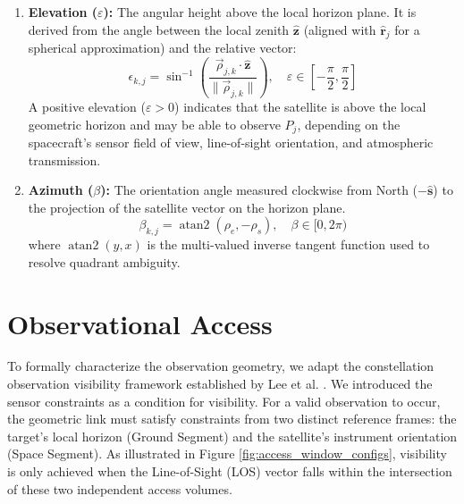 \begin{enumerate}
    \item \textbf{Elevation ($\varepsilon$):} The angular height above the local horizon plane. It is derived from the angle between the local zenith $\hat{\mathbf{z}}$ (aligned with $\hat{\boldsymbol{r}}_{j}$ for a spherical approximation) and the relative vector:    \begin{equation}
        \epsilon_{k,j} = \sin^{-1}\left( \frac{\vec{\rho}_{j,k} \cdot \hat{\mathbf{z}}}{\| \vec{\rho}_{j,k} \|} \right), \quad \varepsilon \in \left[ -\frac{\pi}{2}, \frac{\pi}{2} \right]
    \end{equation}
    A positive elevation ($\varepsilon > 0$) indicates that the satellite is above the local geometric horizon and may be able to observe $P_j$, depending on the spacecraft's sensor field of view, line-of-sight orientation, and atmospheric transmission. 
    \item \textbf{Azimuth ($\beta$):} The orientation angle measured clockwise from North ($-\hat{\mathbf{s}}$) to the projection of the satellite vector on the horizon plane.
\begin{equation}
        \beta_{k,j} = \operatorname{atan2}(\rho_e, -\rho_s), \quad \beta \in [0, 2\pi)
    \end{equation}
    where $\operatorname{atan2}(y, x)$ is the multi-valued inverse tangent function used to resolve quadrant ambiguity.
\end{enumerate}

\section{Observational Access}
\label{sec:observational_access}
To formally characterize the observation geometry, we adapt the constellation observation visibility framework established by Lee et al. \cite{lee_satellite_2020}. We introduced the sensor constraints as a condition for visibility.
For a valid observation to occur, the geometric link must satisfy constraints from two distinct reference frames: the target's local horizon (Ground Segment) and the satellite's instrument orientation (Space Segment). As illustrated in Figure \ref{fig:access_window_configs}, visibility is only achieved when the Line-of-Sight (LOS) vector falls within the intersection of these two independent access volumes.

